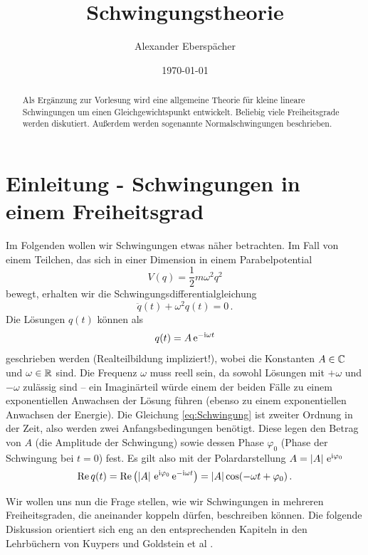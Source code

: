 \documentclass[paper=a4, fontsize=11.0pt, abstractoff, DIV12]{scrartcl}
\title{Schwingungstheorie}
\author{Alexander Eberspächer}
\date{\today}
\begin{document}
\maketitle
\begin{abstract}
Als Ergänzung zur Vorlesung wird eine allgemeine Theorie für kleine lineare
Schwingungen um einen Gleichgewichtspunkt entwickelt. Beliebig viele
Freiheitsgrade werden diskutiert. Außerdem werden sogenannte
Normalschwingungen beschrieben.
\end{abstract}

\section{Einleitung - Schwingungen in einem Freiheitsgrad}

Im Folgenden wollen wir Schwingungen etwas näher betrachten. Im Fall von
einem Teilchen, das sich in einer Dimension in einem Parabelpotential
\begin{equation}
V(q) = \frac{1}{2} m \omega^2 q^2
\label{eq:Pot}
\end{equation}
bewegt, erhalten wir die Schwingungsdifferentialgleichung
\begin{equation}
\ddot{q}(t) + \omega^2 q(t) = 0 \, .
\label{eq:Schwingung}
\end{equation}
Die Lösungen $q(t)$ können als
\begin{equation}
q(t) = A\,{\mathrm{e}}^{-\mathrm{i} \omega t}
\end{equation}
geschrieben werden (Realteilbildung impliziert!), wobei die Konstanten $A
\in \mathbb{C}$ und $\omega \in \mathbb{R}$ sind. Die Frequenz $\omega$ muss reell
sein, da sowohl Lösungen mit $+\omega$ und $-\omega$ zulässig sind -- ein
Imaginärteil würde einem der beiden Fälle zu einem exponentiellen Anwachsen
der Lösung führen (ebenso zu einem exponentiellen Anwachsen der Energie).
Die Gleichung \eqref{eq:Schwingung} ist zweiter Ordnung in der Zeit, also
werden zwei Anfangsbedingungen benötigt. Diese legen den Betrag von $A$
(die Amplitude der Schwingung) sowie dessen Phase $\varphi_0$ (Phase der Schwingung
bei $t=0$) fest. Es gilt also mit der Polardarstellung $A = \left\vert A \right\vert\,{\mathrm{e}}^{\mathrm{i}\varphi_0}$
\begin{equation}
\operatorname{Re} q(t) = \operatorname{Re}\left( \left\vert A \right\vert\,{\mathrm{e}}^{\mathrm{i}\varphi_0}\,{\mathrm{e}}^{-\mathrm{i}\omega t}\right) = \left\vert A \right\vert \cos(-\omega t + \varphi_0)\, .
\end{equation}

Wir wollen uns nun die Frage stellen, wie wir Schwingungen in mehreren
Freiheitsgraden, die aneinander koppeln dürfen, beschreiben können. Die
folgende Diskussion orientiert sich eng an den entsprechenden Kapiteln in den
Lehrbüchern von Kuypers \cite{Kuypers} und Goldstein et al \cite{Goldstein}.
\end{document}
